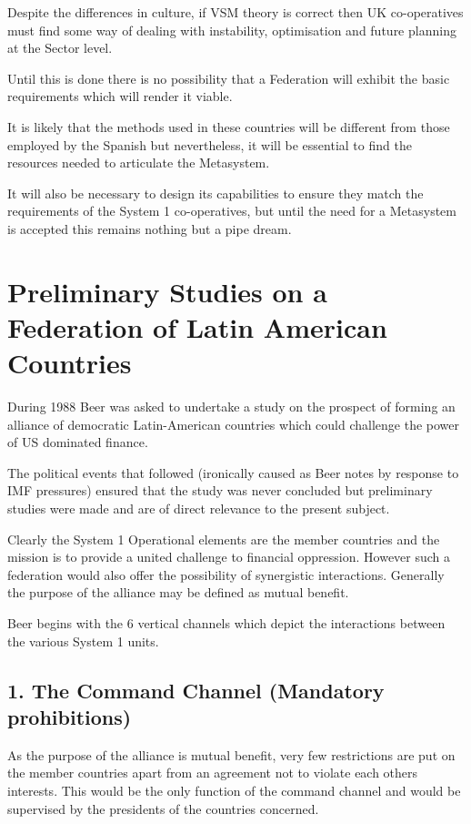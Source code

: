 Despite the differences in culture, if VSM theory is correct then UK co-operatives must find some way of dealing with instability, optimisation and future planning at the Sector level.

Until this is done there is no possibility that a Federation will exhibit the basic requirements which will render it viable.

It is likely that the methods used in these countries will be different from those employed by the Spanish but nevertheless, it will be essential to find the resources needed to articulate the Metasystem.

It will also be necessary to design its capabilities to ensure they match the requirements of the System 1 co-operatives, but until the need for a Metasystem is accepted this remains nothing but a pipe dream.

\section*{Preliminary Studies on a Federation of Latin American Countries}
During 1988 Beer was asked to undertake a study on the prospect of forming an alliance of democratic Latin-American countries which could challenge the power of US dominated finance.

The political events that followed (ironically caused as Beer notes by response to IMF pressures) ensured that the study was never concluded but preliminary studies were made and are of direct relevance to the present subject.

Clearly the System 1 Operational elements are the member countries and the mission is to provide a united challenge to financial oppression. However such a federation would also offer the possibility of synergistic interactions. Generally the purpose of the alliance may be defined as mutual benefit.

Beer begins with the 6 vertical channels which depict the interactions between the various System 1 units.

\subsection*{1. The Command Channel (Mandatory prohibitions)}
As the purpose of the alliance is mutual benefit, very few restrictions are put on the member countries apart from an agreement not to violate each others interests. This would be the only function of the command channel and would be supervised by the presidents of the countries concerned.

